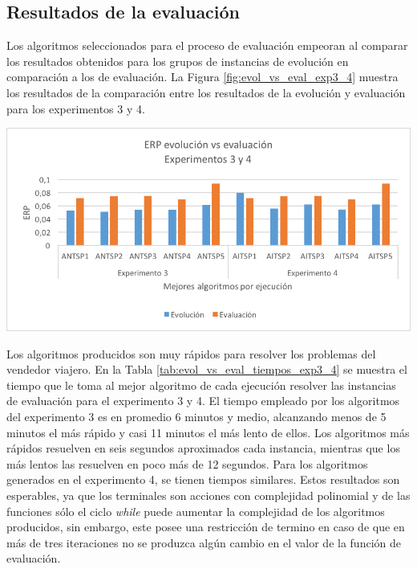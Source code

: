 \subsection{Resultados de la evaluación}

Los algoritmos seleccionados para el proceso de evaluación empeoran al comparar los resultados obtenidos para los grupos de instancias de evolución en comparación a los de evaluación. La Figura \ref{fig:evol_vs_eval_exp3_4} muestra los resultados de la comparación entre los resultados de la evolución y evaluación para los experimentos 3 y 4.

\begingroup
    \centering
    \includegraphics[width=14cm]{images/cap6/evol_vs_eval_exp3_4.png}
    \label{fig:evol_vs_eval_exp3_4}
\endgroup

Los algoritmos producidos son muy rápidos para resolver los problemas del vendedor viajero. En la Tabla \ref{tab:evol_vs_eval_tiempos_exp3_4} se muestra el tiempo que le toma al mejor algoritmo de cada ejecución resolver las instancias de evaluación para el experimento 3 y 4. El tiempo empleado por los algoritmos del experimento 3 es en promedio 6 minutos y medio, alcanzando menos de 5 minutos el más rápido y casi 11 minutos el más lento de ellos. Los algoritmos más rápidos resuelven en seis segundos aproximados cada instancia, mientras que los más lentos las resuelven en poco más de 12 segundos. Para los algoritmos generados en el experimento 4, se tienen tiempos similares. Estos resultados son esperables, ya que los terminales son acciones con complejidad polinomial y de las funciones sólo el ciclo \textit{while} puede aumentar la complejidad de los algoritmos producidos, sin embargo, este posee una restricción de termino en caso de que en más de tres iteraciones no se produzca algún cambio en el valor de la función de evaluación.

